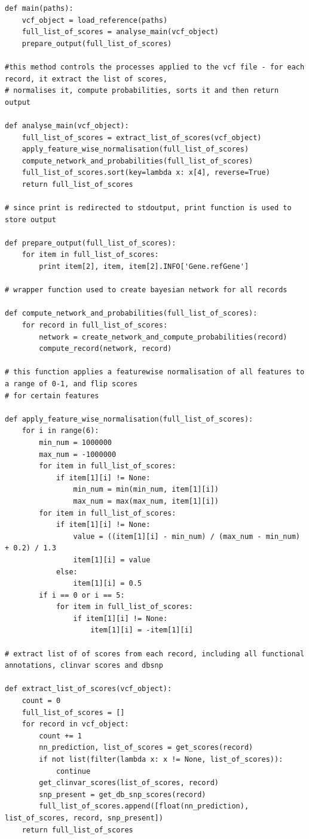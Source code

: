 \documentclass{article}
\begin{document}
\begin{verbatim}
def main(paths):
    vcf_object = load_reference(paths)
    full_list_of_scores = analyse_main(vcf_object)
    prepare_output(full_list_of_scores)

#this method controls the processes applied to the vcf file - for each record, it extract the list of scores,
# normalises it, compute probabilities, sorts it and then return output

def analyse_main(vcf_object):
    full_list_of_scores = extract_list_of_scores(vcf_object)
    apply_feature_wise_normalisation(full_list_of_scores)
    compute_network_and_probabilities(full_list_of_scores)
    full_list_of_scores.sort(key=lambda x: x[4], reverse=True)
    return full_list_of_scores

# since print is redirected to stdoutput, print function is used to store output

def prepare_output(full_list_of_scores):
    for item in full_list_of_scores:
        print item[2], item, item[2].INFO['Gene.refGene']

# wrapper function used to create bayesian network for all records

def compute_network_and_probabilities(full_list_of_scores):
    for record in full_list_of_scores:
        network = create_network_and_compute_probabilities(record)
        compute_record(network, record)

# this function applies a featurewise normalisation of all features to a range of 0-1, and flip scores
# for certain features

def apply_feature_wise_normalisation(full_list_of_scores):
    for i in range(6):
        min_num = 1000000
        max_num = -1000000
        for item in full_list_of_scores:
            if item[1][i] != None:
                min_num = min(min_num, item[1][i])
                max_num = max(max_num, item[1][i])
        for item in full_list_of_scores:
            if item[1][i] != None:
                value = ((item[1][i] - min_num) / (max_num - min_num) + 0.2) / 1.3
                item[1][i] = value
            else:
                item[1][i] = 0.5
        if i == 0 or i == 5:
            for item in full_list_of_scores:
                if item[1][i] != None:
                    item[1][i] = -item[1][i]

# extract list of of scores from each record, including all functional annotations, clinvar scores and dbsnp

def extract_list_of_scores(vcf_object):
    count = 0
    full_list_of_scores = []
    for record in vcf_object:
        count += 1
        nn_prediction, list_of_scores = get_scores(record)
        if not list(filter(lambda x: x != None, list_of_scores)):
            continue
        get_clinvar_scores(list_of_scores, record)
        snp_present = get_db_snp_scores(record)
        full_list_of_scores.append([float(nn_prediction), list_of_scores, record, snp_present])
    return full_list_of_scores


\end{verbatim}
\end{document}
